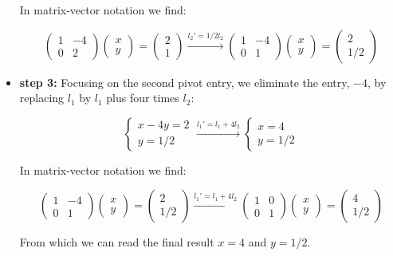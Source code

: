 \documentclass[
  letterpaper,
  DIV=11,
  numbers=noendperiod]{scrartcl}
\theoremstyle{definition}
\theoremstyle{remark}
\begin{document}
\begin{itemize}
  In matrix-vector notation we find:

  \[
  \begin{pmatrix} 1 & -4\\ 0 & 2 \end{pmatrix}\begin{pmatrix}x\\y\end{pmatrix}= \begin{pmatrix}2\\1\end{pmatrix}\overset{l_2'=1/2l_2}{\longrightarrow} \begin{pmatrix} 1 & -4\\ 0 & 1 \end{pmatrix}\begin{pmatrix}x\\y\end{pmatrix}= \begin{pmatrix}2\\1/2\end{pmatrix}
  \]
\item
  \textbf{step 3:} Focusing on the second pivot entry, we eliminate the
  entry, \(-4\), by replacing \(l_1\) by \(l_1\) plus four times
  \(l_2\):

  \[
  \begin{cases} x -4y =2\\ y = 1/2\end{cases}\overset{l_1'=l_1+4l_2}{\longrightarrow}\begin{cases} x =4\\ y = 1/2\end{cases}
  \]

  In matrix-vector notation we find:

  \[
  \begin{pmatrix} 1 & -4\\ 0 & 1 \end{pmatrix}\begin{pmatrix}x\\y\end{pmatrix}= \begin{pmatrix}2\\1/2\end{pmatrix}\overset{l_1'=l_1+4l_2}{\longrightarrow} \begin{pmatrix} 1 & 0\\ 0 & 1 \end{pmatrix}\begin{pmatrix}x\\y\end{pmatrix}= \begin{pmatrix}4\\1/2\end{pmatrix}
  \]

  From which we can read the final result \(x=4\) and \(y=1/2\).
\end{itemize}
\end{document}
